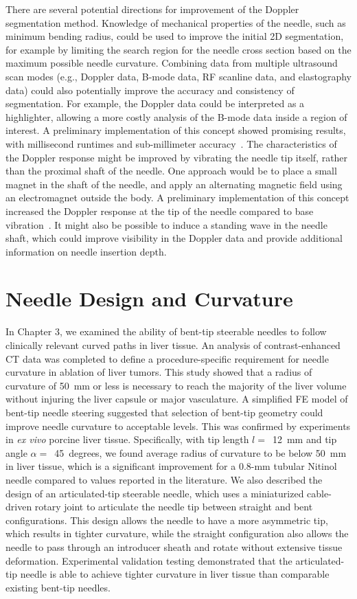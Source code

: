 There are several potential directions for improvement of the Doppler segmentation method. Knowledge of mechanical properties of the needle, such as minimum bending radius, could be used to improve the initial 2D segmentation, for example by limiting the search region for the needle cross section based on the maximum possible needle curvature. Combining data from multiple ultrasound scan modes (e.g., Doppler data, B-mode data, RF scanline data, and elastography data) could also potentially improve the accuracy and consistency of segmentation. For example, the Doppler data could be interpreted as a highlighter, allowing a more costly analysis of the B-mode data inside a region of interest. A preliminary implementation of this concept showed promising results, with millisecond runtimes and sub-millimeter accuracy~\cite{Greer2014}. The characteristics of the Doppler response might be improved by vibrating the needle tip itself, rather than the proximal shaft of the needle. One approach would be to place a small magnet in the shaft of the needle, and apply an alternating magnetic field using an electromagnet outside the body. A preliminary implementation of this concept increased the Doppler response at the tip of the needle compared to base vibration~\cite{Cabreros2014}. It might also be possible to induce a standing wave in the needle shaft, which could improve visibility in the Doppler data and provide additional information on needle insertion depth.

\section{Needle Design and Curvature}
In Chapter 3, we examined the ability of bent-tip steerable needles to follow clinically relevant curved paths in liver tissue. An analysis of contrast-enhanced CT data was completed to define a procedure-specific requirement for needle curvature in ablation of liver tumors. This study showed that a radius of curvature of 50~mm or less is necessary to reach the majority of the liver volume without injuring the liver capsule or major vasculature. A simplified FE model of bent-tip needle steering suggested that selection of bent-tip geometry could improve needle curvature to acceptable levels. This was confirmed by experiments in \textit{ex vivo} porcine liver tissue. Specifically, with tip length $l =$~12~mm and tip angle $\alpha =$~45~degrees, we found average radius of curvature to be below 50~mm in liver tissue, which is a significant improvement for a 0.8-mm tubular Nitinol needle compared to values reported in the literature. We also described the design of an articulated-tip steerable needle, which uses a miniaturized cable-driven rotary joint to articulate the needle tip between straight and bent configurations. This design allows the needle to have a more asymmetric tip, which results in tighter curvature, while the straight configuration also allows the needle to pass through an introducer sheath and rotate without extensive tissue deformation. Experimental validation testing demonstrated that the articulated-tip needle is able to achieve tighter curvature in liver tissue than comparable existing bent-tip needles. 

